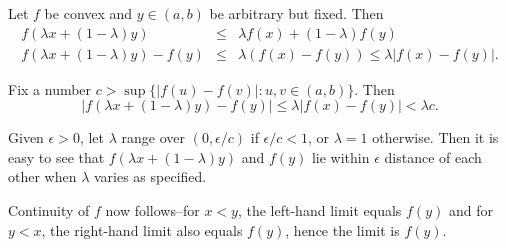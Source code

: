 \documentclass[12pt]{article}
\begin{document}
Let $f$ be convex and $y\in(a, b)$ be arbitrary but fixed. Then
\begin{eqnarray}
    f(\lambda x+(1-\lambda)y) &\leq& \lambda f(x)+(1-\lambda)f(y) \\
    f(\lambda x+(1-\lambda)y)-f(y) &\leq&
    \lambda(f(x)-f(y))\leq\lambda|f(x)-f(y)|.
\end{eqnarray}

Fix a number $c>\sup\{|f(u)-f(v)|: u,v\in(a, b)\}$. Then
\begin{equation}\label{5}
    |f(\lambda
    x+(1-\lambda)y)-f(y)|\leq\lambda|f(x)-f(y)|<\lambda c.
\end{equation}

Given $\epsilon>0$, let $\lambda$ range over $(0, \epsilon/c)$ if
$\epsilon/c<1$, or $\lambda=1$ otherwise. Then it is easy to see
that $f(\lambda x+(1-\lambda)y)$ and $f(y)$ lie within $\epsilon$
distance of each other when $\lambda$ varies as specified.

Continuity of $f$ now follows--for $x<y$, the left-hand limit equals
$f(y)$ and for $y<x$, the right-hand limit also equals $f(y)$, hence
the limit is $f(y)$.
\end{document}
